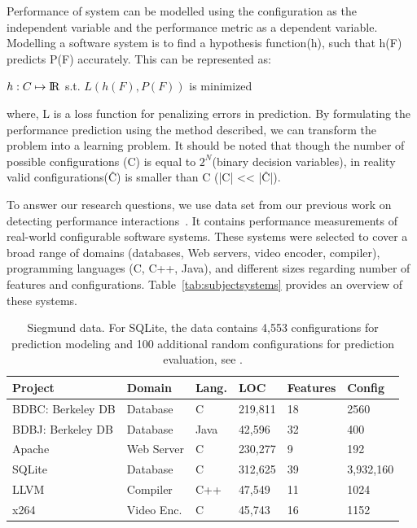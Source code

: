 \documentclass{sig-alternative}
\begin{document}
    Performance of system can be modelled using the configuration as the independent variable and the performance metric as a dependent variable. 
    Modelling a software system is to find a hypothesis function(h), such that h(F) predicts P(F) accurately. This can be represented as:\\
\begin{center}
    $ h: C \mapsto \rm I\!R$ s.t. $L(h(F), P(F))$ is minimized\\
\end{center}

where, L is a loss function for penalizing errors in prediction. By formulating the performance prediction using the method described, we can transform the problem into a learning problem. 
    It should be noted that though the number of possible configurations (C) is equal to $2^N$(binary decision variables), in reality valid configurations(\^{C}) is smaller than C (|C| << |\^C|). 


To answer our research questions, we use data set from our previous work on detecting performance interactions~\cite{SKR+12}. It contains performance measurements of real-world configurable software systems.
These systems were selected to cover a broad range of domains (databases, Web servers, video encoder, compiler), programming languages (C, C++, Java), and different sizes regarding number of features and configurations. Table~\ref{tab:subjectsystems} provides an overview of these systems.
 
 \begin{table}[!t]
\scriptsize
\begin{tabular}{llllll}
  \hline
Project & Domain & Lang. & LOC & Features & Config\\\hline
BDBC: Berkeley DB   & Database & C & 219,811 & 18 & 2560\\
BDBJ: Berkeley DB   & Database & Java & 42,596 & 32  & 400\\
Apache & Web Server & C & 230,277 & 9 & 192\\
SQLite & Database & C & 312,625 & 39 & 3,932,160\\
LLVM & Compiler & C++ & 47,549 & 11 & 1024\\
x264 & Video Enc. & C& 45,743 & 16 & 1152\\\hline
\end{tabular}
 \label{tab:subjectsystems}
\caption{Siegmund data.
For SQLite, the data  contains 4,553 configurations for prediction modeling and 100 additional random configurations for prediction evaluation, see \cite{guo2013variability}.}\label{fig:cpm}
\end{table}
\end{document}
